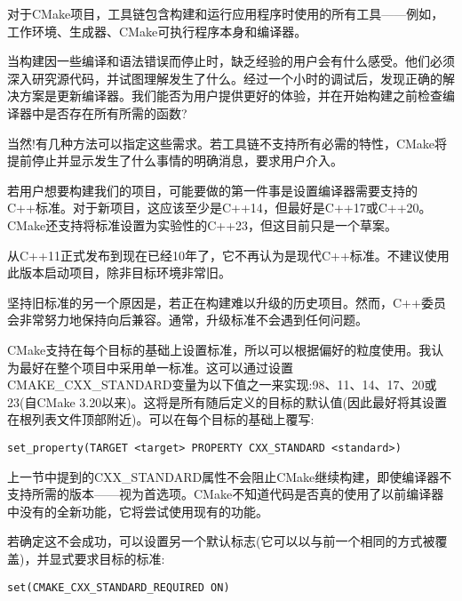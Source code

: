 
对于CMake项目，工具链包含构建和运行应用程序时使用的所有工具——例如，工作环境、生成器、CMake可执行程序本身和编译器。

当构建因一些编译和语法错误而停止时，缺乏经验的用户会有什么感受。他们必须深入研究源代码，并试图理解发生了什么。经过一个小时的调试后，发现正确的解决方案是更新编译器。我们能否为用户提供更好的体验，并在开始构建之前检查编译器中是否存在所有所需的函数?

当然!有几种方法可以指定这些需求。若工具链不支持所有必需的特性，CMake将提前停止并显示发生了什么事情的明确消息，要求用户介入。


若用户想要构建我们的项目，可能要做的第一件事是设置编译器需要支持的C++标准。对于新项目，这应该至少是C++14，但最好是C++17或C++20。CMake还支持将标准设置为实验性的C++23，但这目前只是一个草案。

\begin{tcolorbox}[colback=blue!5!white,colframe=blue!75!black,title=Note]
从C++11正式发布到现在已经10年了，它不再认为是现代C++标准。不建议使用此版本启动项目，除非目标环境非常旧。

坚持旧标准的另一个原因是，若正在构建难以升级的历史项目。然而，C++委员会非常努力地保持向后兼容。通常，升级标准不会遇到任何问题。
\end{tcolorbox}

CMake支持在每个目标的基础上设置标准，所以可以根据偏好的粒度使用。我认为最好在整个项目中采用单一标准。这可以通过设置CMAKE\_CXX\_STANDARD变量为以下值之一来实现:98、11、14、17、20或23(自CMake 3.20以来)。这将是所有随后定义的目标的默认值(因此最好将其设置在根列表文件顶部附近)。可以在每个目标的基础上覆写:


\begin{lstlisting}[style=styleCMake]
set_property(TARGET <target> PROPERTY CXX_STANDARD <standard>)
\end{lstlisting}


上一节中提到的CXX\_STANDARD属性不会阻止CMake继续构建，即使编译器不支持所需的版本——视为首选项。CMake不知道代码是否真的使用了以前编译器中没有的全新功能，它将尝试使用现有的功能。

若确定这不会成功，可以设置另一个默认标志(它可以以与前一个相同的方式被覆盖)，并显式要求目标的标准:

\begin{lstlisting}[style=styleCMake]
set(CMAKE_CXX_STANDARD_REQUIRED ON)
\end{lstlisting}

